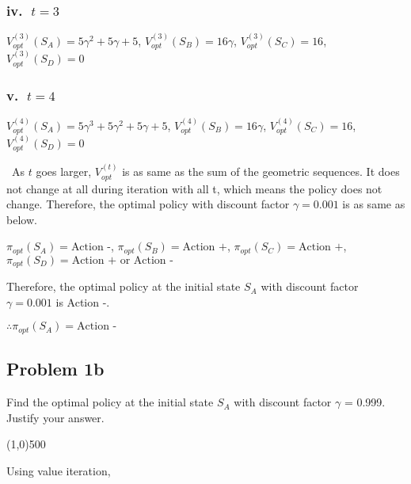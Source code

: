 \documentclass{article}
\begin{document}
\subsubsection*{iv.$\mbox{ }t=3$}
\begin{center}
    $V_{opt}^{(3)}(S_A)=5\gamma^2+5\gamma+5$,
    $V_{opt}^{(3)}(S_B)=16\gamma$,
    $V_{opt}^{(3)}(S_C)=16$,
    $V_{opt}^{(3)}(S_D)=0$
\end{center}    
    
\subsubsection*{v.$\mbox{ }t=4$}
\begin{center}
    $V_{opt}^{(4)}(S_A)=5\gamma^3+5\gamma^2+5\gamma+5$,
    $V_{opt}^{(4)}(S_B)=16\gamma$,
    $V_{opt}^{(4)}(S_C)=16$,
    $V_{opt}^{(4)}(S_D)=0$    
\end{center}

\ As $t$ goes larger, $V_{opt}^{(t)}$ is as same as the sum of the geometric sequences. It does not change at all during iteration with all t, which means the policy does not change. Therefore, the optimal policy with discount factor $\gamma = 0.001$ is as same as below.\\

\begin{center}
    $\pi_{opt}(S_A)=\mbox{Action -}$,
    $\pi_{opt}(S_B)=\mbox{Action +}$,
    $\pi_{opt}(S_C)=\mbox{Action +}$,
    $\pi_{opt}(S_D)=\mbox{Action + or Action -}$
\end{center}

Therefore, the optimal policy at the initial state $S_A$ with discount factor $\gamma =0.001$ is Action -.\\

\begin{center}
    $\therefore\pi_{opt}(S_A)=\mbox{Action -}$
\end{center}

\subsection*{Problem 1b}
Find the optimal policy at the initial state $S_A$ with discount factor $\gamma$ = 0.999. Justify your answer.

\begin{center}
    \line(1,0){500}
\end{center}

Using value iteration,
\end{document}
